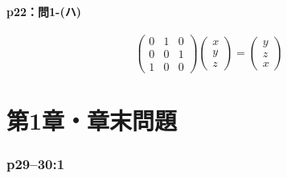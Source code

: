\documentclass[a4paper,10pt,fleqn]{ltjsarticle}
\begin{document}
\subsection*{p22：問1-(ハ)}

\begin{tleftbar}
    \[
        \begin{pmatrix}
            0 & 1 & 0 \\
            0 & 0 & 1 \\
            1 & 0 & 0
        \end{pmatrix}
        \begin{pmatrix}
            x \\
            y \\
            z
        \end{pmatrix}
        =\begin{pmatrix}
            y \\
            z \\
            x
        \end{pmatrix}
    \]
\end{tleftbar}


\setcounter{equation}{0}

\part*{第1章・章末問題}


\section*{p29--30:1}
\end{document}
